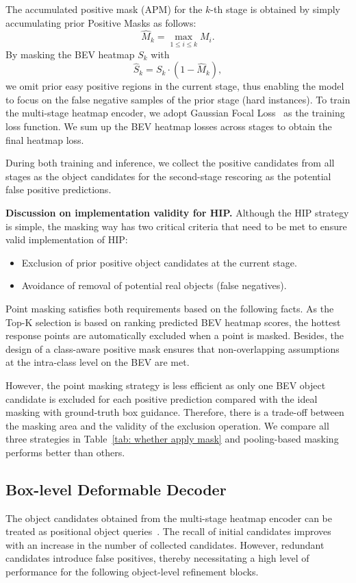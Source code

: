 \documentclass[10pt,twocolumn,letterpaper]{article}
\begin{document}
The accumulated positive mask (APM) for the $k$-th stage is obtained by simply accumulating prior Positive Masks as follows:
$$ \hat{M}_{k} = \max_{1\leq i\leq k} M_i. $$
By masking the BEV heatmap $S_{k}$ with 
$$\hat{S}_k = S_k \cdot (1 - \hat{M}_k),$$
we omit prior easy positive regions in the current stage, thus enabling the model to focus on the false negative samples of the prior stage (hard instances). To train the multi-stage heatmap encoder, we adopt Gaussian Focal Loss~\cite{transfusion} as the training loss function. We sum up the BEV heatmap losses across stages to obtain the final heatmap loss.



During both training and inference, we collect the positive candidates from all stages as the object candidates for the second-stage rescoring as the potential false positive predictions. 


\vspace{1mm}
\noindent\textbf{Discussion on implementation validity for HIP.} 
Although the HIP strategy is simple, the masking way has two critical criteria that need to be met to ensure valid implementation of HIP: 
\begin{itemize} 
    \item Exclusion of prior positive object candidates at the current stage. 
    \item Avoidance of removal of potential real objects (false negatives). 
\end{itemize}
Point masking satisfies both requirements based on the following facts. As the Top-K selection is based on ranking predicted BEV heatmap scores, the hottest response points are automatically excluded when a point is masked. Besides, the design of a class-aware positive mask ensures that non-overlapping assumptions at the intra-class level on the BEV are met. 

However, the point masking strategy is less efficient as only one BEV object candidate is excluded for each positive prediction compared with the ideal masking with ground-truth box guidance. Therefore, there is a trade-off between the masking area and the validity of the exclusion operation. We compare all three strategies in Table~\ref{tab: whether apply mask} and pooling-based masking performs better than others.







\subsection{Box-level Deformable Decoder}
\label{sec:decoder}
The object candidates obtained from the multi-stage heatmap encoder can be treated as positional object queries~\cite{efficientdetr, transfusion}. The recall of initial candidates improves with an increase in the number of collected candidates. However, redundant candidates introduce false positives, thereby necessitating a high level of performance for the following object-level refinement blocks. 
\end{document}
